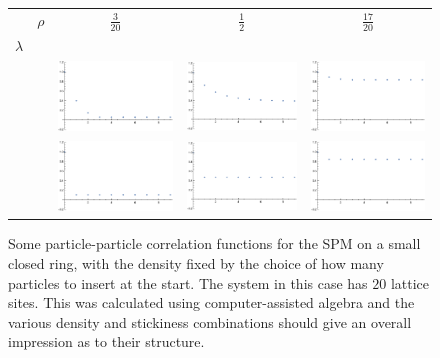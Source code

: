 \begin{figure}[h!]
\caption[Plots of the equal-time particle density correlation function on a ring.]{\label{fig:corrFns}Some particle-particle correlation functions for the SPM on a small closed ring,
with the density fixed by the choice of how many particles to insert at the start. The system in this case has $20$ lattice sites.
This was calculated using computer-assisted algebra and the various density and stickiness combinations should give an overall impression as to their structure.}
\begin{center}
 \begin{tabular}{c  c | c | c | c}
  & $\rho$ & $\frac{3}{20}$ & $\frac{1}{2}$ & $\frac{17}{20}$ \\
  $\lambda$ & & & & \\
 \hline
    \raisebox{3 em}{ $\frac{1}{10}$ } & & \includegraphics[width=0.25\linewidth]{analytics/images/exactCorrFns/lowDensLowL}  & \includegraphics[width=0.25 \linewidth]{analytics/images/exactCorrFns/midDensLowL} & \includegraphics[width=0.25 \linewidth]{analytics/images/exactCorrFns/highDensLowL} \\
    \hline
    \raisebox{3 em}{ $1$ } & &    \includegraphics[width=0.25\linewidth]{analytics/images/exactCorrFns/lowDensMidL}  & \includegraphics[width=0.25 \linewidth]{analytics/images/exactCorrFns/midDensMidL} & \includegraphics[width=0.25 \linewidth]{analytics/images/exactCorrFns/highDensMidL} \\

\end{tabular}
\end{center}
\end{figure}
